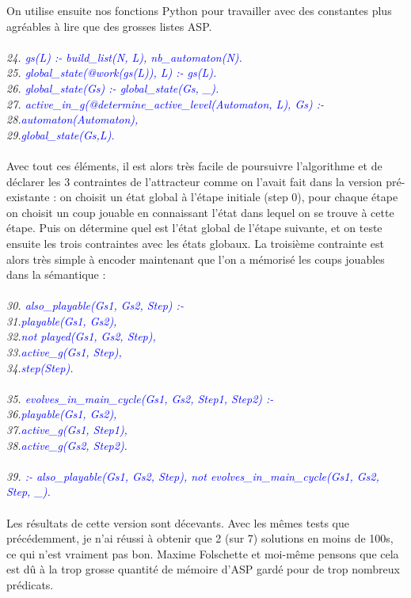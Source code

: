 \documentclass[12pt,a4paper]{article}
\begin{document}
On utilise ensuite nos fonctions Python pour travailler avec des constantes plus agréables à lire que des grosses listes ASP.\\ \\
\emph{
	24. \textcolor{blue}{gs(L) :- build\_list(N, L), nb\_automaton(N).}\\
	25. \textcolor{blue}{global\_state(@work(gs(L)), L) :- gs(L). }\\ 
	26. \textcolor{blue}{global\_state(Gs) :- global\_state(Gs, \_).}\\
	27. \textcolor{blue}{active\_in\_g(@determine\_active\_level(Automaton, L), Gs) :-}\\
	28.\qquad\textcolor{blue}{automaton(Automaton),}\\
	29.\qquad\textcolor{blue}{global\_state(Gs,L).}\\ \\
}
Avec tout ces éléments, il est alors très facile de poursuivre l'algorithme et de déclarer les 3 contraintes de l'attracteur comme on l'avait fait dans la version pré-existante : on choisit un état global à l'étape initiale 
(step 0), pour chaque étape on choisit un coup jouable en connaissant l'état dans lequel on se trouve à cette étape. Puis on détermine quel est l'état global de l'étape suivante, et on teste ensuite les trois contraintes avec les 
états globaux. La troisième contrainte est alors très simple à encoder maintenant que l'on a mémorisé les coups jouables dans la sémantique :\\ \\
\emph{
	30. \textcolor{blue}{also\_playable(Gs1, Gs2, Step) :-}\\
	31.\qquad\textcolor{blue}{playable(Gs1, Gs2),}\\
	32.\qquad\textcolor{blue}{not played(Gs1, Gs2, Step),}\\
	33.\qquad\textcolor{blue}{active\_g(Gs1, Step),}\\
	34.\qquad\textcolor{blue}{step(Step).}\\ \\
	35. \textcolor{blue}{evolves\_in\_main\_cycle(Gs1, Gs2, Step1, Step2) :-}\\
	36.\qquad\textcolor{blue}{playable(Gs1, Gs2),}\\
	37.\qquad\textcolor{blue}{active\_g(Gs1, Step1),}\\
	38.\qquad\textcolor{blue}{active\_g(Gs2, Step2).}\\ \\
	39. \textcolor{blue}{:- also\_playable(Gs1, Gs2, Step), not evolves\_in\_main\_cycle(Gs1, Gs2, Step, \_).}\\ \\
}
Les résultats de cette version sont décevants. Avec les mêmes tests que précédemment, je n'ai réussi à obtenir que 2 (sur 7) solutions en moins de 100s, ce qui n'est vraiment pas bon. Maxime Folschette et moi-même pensons que cela 
est dû à la trop grosse quantité de mémoire d'ASP gardé pour de trop nombreux prédicats.
\end{document}
